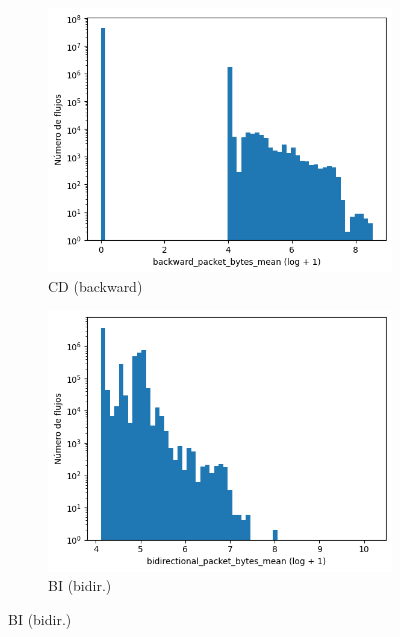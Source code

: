 \begin{figure}[H]
\begin{subfigure}[b]{0.26\textwidth}
        \includegraphics[width=\textwidth]{media/packet_pincer_cicddos/backward_packet_bytes_mean_log_x_log_y.png}
        \caption{CD (backward)}
    \end{subfigure}
    \hfill
    \begin{subfigure}[b]{0.26\textwidth}
        \centering
        \includegraphics[width=\linewidth]{media/packet_pincer_botiot/bidirectional_packet_bytes_mean_log_x_log_y.png}
        \caption{BI (bidir.)}

\end{subfigure}
\end{figure}
